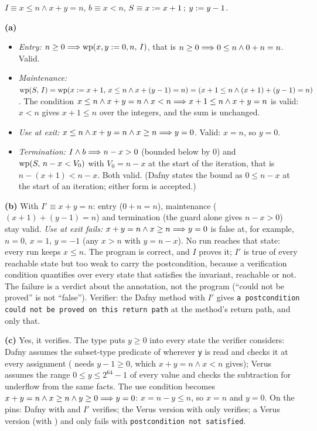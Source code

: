 \documentclass[11pt]{article}
\begin{document}
$I \equiv x \leq n \wedge x + y = n$, $b \equiv x < n$,
$S \equiv x \mathrel{:=} x + 1 \mathbin{;}\, y \mathrel{:=} y - 1$.

\textbf{(a)}
\begin{itemize}
\item \emph{Entry:} $n \geq 0 \Longrightarrow \mathrm{wp}(x, y \mathrel{:=} 0, n,\,I)$, that is
  $n \geq 0 \Longrightarrow 0 \leq n \wedge 0 + n = n$. Valid.
\item \emph{Maintenance:} $\mathrm{wp}(S,\,I) = \mathrm{wp}(x \mathrel{:=} x + 1,\,x \leq n \wedge x + (y - 1) = n)
  = (x + 1 \leq n \wedge (x + 1) + (y - 1) = n)$. The condition
  $x \leq n \wedge x + y = n \wedge x < n \Longrightarrow x + 1 \leq n \wedge x + y = n$ is valid:
  $x < n$ gives $x + 1 \leq n$ over the integers, and the sum is unchanged.
\item \emph{Use at exit:} $x \leq n \wedge x + y = n \wedge x \geq n \Longrightarrow y = 0$.
  Valid: $x = n$, so $y = 0$.
\item \emph{Termination:} $I \wedge b \Longrightarrow n - x > 0$ (bounded below by $0$) and
  $\mathrm{wp}(S,\,n - x < V_0)$ with $V_0 = n - x$ at the start of the iteration, that is
  $n - (x + 1) < n - x$. Both valid. (Dafny states the bound as
  $0 \leq n - x$ at the start of an iteration; either form is accepted.)
\end{itemize}

\textbf{(b)} With $I' \equiv x + y = n$: entry ($0 + n = n$), maintenance
($(x+1) + (y-1) = n$) and termination (the guard alone gives $n - x > 0$) stay
valid. \emph{Use at exit fails:} $x + y = n \wedge x \geq n \Longrightarrow y = 0$ is
false at, for example, $n = 0$, $x = 1$, $y = -1$ (any $x > n$ with $y = n - x$).
No run reaches that state: every run keeps $x \leq n$. The program is
correct, and $I$ proves it; $I'$ is true of every reachable state but too weak
to carry the postcondition, because a verification condition quantifies over
every state that satisfies the invariant, reachable or not. The failure is a
verdict about the annotation, not the program (``could not be proved'' is not
``false''). Verifier: the Dafny method with $I'$ gives
\texttt{a postcondition could not be proved on this return path} at the
method's return path, and only that.

\textbf{(c)} Yes, it verifies. The type puts $y \geq 0$ into every state the
verifier considers: Dafny assumes the subset-type predicate of 
wherever \texttt{y} is read and checks it at every assignment (
needs $y - 1 \geq 0$, which $x + y = n \wedge x < n$ gives); Verus assumes the
range $0 \leq y \leq 2^{64} - 1$ of every  value and checks the
subtraction for underflow from the same facts. The use condition becomes
$x + y = n \wedge x \geq n \wedge y \geq 0 \Longrightarrow y = 0$: $x = n - y \leq n$, so
$x = n$ and $y = 0$. On the pins: Dafny with  and $I'$ verifies;
the Verus  version with only  verifies; a Verus
 version (with ) and only  fails
with \texttt{postcondition not satisfied}.
\end{document}
